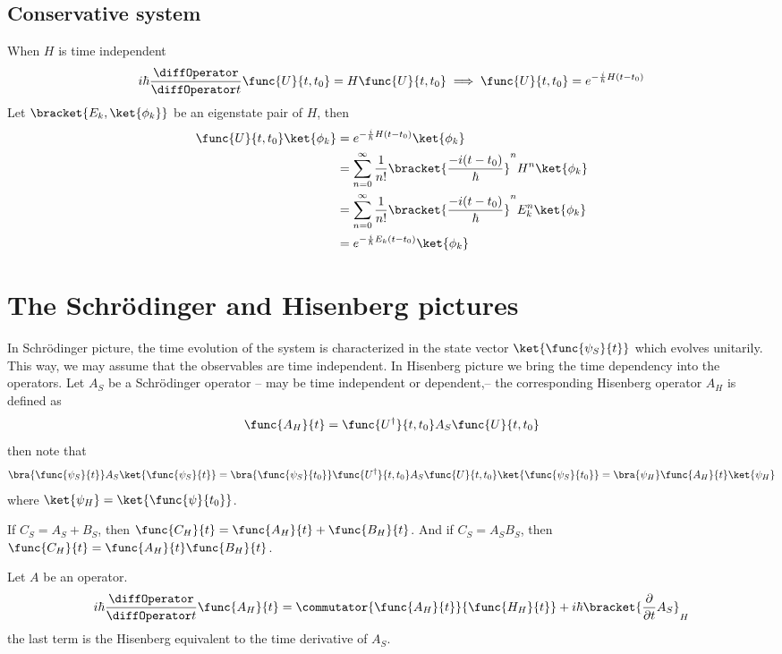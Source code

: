 \subsection{Conservative system}
When \(H\) is time independent
\begin{equation*}
    i\hbar \dfrac{\diffOperator}{ \diffOperator t} \func{U}{t,t_0} = H \func{U}{t,t_0} \implies \func{U}{t,t_0} = e^{-\frac{i}{\hbar} H (t - t_0)}
\end{equation*}
Let \(\bracket{E_k,\ket{\phi_k}}\) be an eigenstate pair of \(H\), then
\begin{align*}
    \func{U}{t,t_0} \ket{\phi_k} & = e^{-\frac{i}{\hbar} H (t - t_0)} \ket{\phi_k}                                                  \\
                                 & = \sum_{n = 0}^{\infty} \dfrac{1}{n!} \bracket{\dfrac{-i (t - t_0)}{\hbar}}^n H^n \ket{\phi_k}   \\
                                 & = \sum_{n = 0}^{\infty} \dfrac{1}{n!} \bracket{\dfrac{-i (t - t_0)}{\hbar}}^n E_k^n \ket{\phi_k} \\
                                 & = e^{-\frac{i}{\hbar} E_k (t - t_0)} \ket{\phi_k}
\end{align*}
\section{The Schr\"{o}dinger and Hisenberg pictures}
In Schr\"{o}dinger picture, the time evolution of the system is characterized in the state vector \(\ket{\func{\psi_S}{t}}\) which evolves unitarily. This way, we may assume that the observables are time independent. In Hisenberg picture we bring the time dependency into the operators. Let \(A_S\) be a Schr\"{o}dinger operator -- may be time independent or dependent,-- the corresponding Hisenberg operator \(A_H\) is defined as 
\begin{equation*}
    \func{A_H}{t} = \func{U^{\dagger}}{t,t_0} A_S \func{U}{t,t_0}
\end{equation*}
then note that 
\begin{equation*}
    \bra{\func{\psi_S}{t}} A_S \ket{\func{\psi_S}{t}} = \bra{\func{\psi_S}{t_0}} \func{U^{\dagger}}{t,t_0} A_S \func{U}{t,t_0}\ket{\func{\psi_S}{t_0}} = \bra{\psi_H} \func{A_H}{t} \ket{\psi_H} 
\end{equation*}
where \(\ket{\psi_H} = \ket{\func{\psi}{t_0}}\).

\begin{proposition}
    If \(C_S = A_S + B_S\), then \(\func{C_H}{t} = \func{A_H}{t} + \func{B_H}{t}\). And if \(C_S = A_S B_S\), then \(\func{C_H}{t} = \func{A_H}{t} \func{B_H}{t}\).
\end{proposition}

\begin{proposition}
    Let \(A\) be an operator. 
    \begin{equation*}
        i \hbar \dfrac{\diffOperator }{\diffOperator t} \func{A_H}{t} = \commutator{\func{A_H}{t}}{\func{H_H}{t}} + i \hbar \bracket{\dfrac{\partial}{\partial t} A_S }_H
    \end{equation*}
    the last term is the Hisenberg equivalent to the time derivative of \(A_S\).
\end{proposition}
